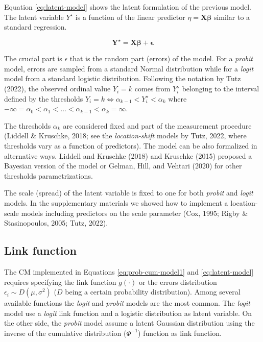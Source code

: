 \documentclass[
  man,floatsintext]{apa6}
\begin{document}
\normalsize

Equation \eqref{eq:latent-model} shows the latent formulation of the previous model. The latent variable \(Y^\star\) is a function of the linear predictor \(\eta = \mathbf{X} \boldsymbol{\beta}\) similar to a standard regression.

\begin{equation}
\mathbf{Y^\star} = \mathbf{X}\boldsymbol{\beta} + \mathbf{\epsilon}
\label{eq:latent-model}
\end{equation}

The crucial part is \(\epsilon\) that is the random part (errors) of the model. For a \emph{probit} model, errors are sampled from a standard Normal distribution while for a \emph{logit} model from a standard logistic distribution. Following the notation by Tutz (2022), the observed ordinal value \(Y_i = k\) comes from \(Y^\star_i\) belonging to the interval defined by the thresholds \(Y_i = k \iff \alpha_{k - 1} < Y^\star_i < \alpha_{k}\) where \(- \infty = \alpha_0 < \alpha_1 < \dots< \alpha_{k - 1} < \alpha_k = \infty\).

The thresholds \(\alpha_k\) are considered fixed and part of the measurement procedure (Liddell \& Kruschke, 2018; see the \emph{location-shift} models by Tutz, 2022, where thresholds vary as a function of predictors). The model can be also formalized in alternative ways. Liddell and Kruschke (2018) and Kruschke (2015) proposed a Bayesian version of the model or Gelman, Hill, and Vehtari (2020) for other thresholds parametrizations.

The scale (spread) of the latent variable is fixed to one for both \emph{probit} and \emph{logit} models. In the supplementary materials we showed how to implement a location-scale models including predictors on the scale parameter (Cox, 1995; Rigby \& Stasinopoulos, 2005; Tutz, 2022).

\subsection{Link function}\label{link-function}

The CM implemented in Equations \eqref{eq:prob-cum-model1} and \eqref{eq:latent-model} requires specifying the link function \(g(\cdot)\) or the errors distribution \(\epsilon_i \sim D(\mu, \sigma^2)\) (\(D\) being a certain probability distribution). Among several available functions the \emph{logit} and \emph{probit} models are the most common. The \emph{logit} model use a \emph{logit} link function and a logistic distribution as latent variable. On the other side, the \emph{probit} model assume a latent Gaussian distribution using the inverse of the cumulative distribution (\(\Phi^{-1}\)) function as link function.
\end{document}
